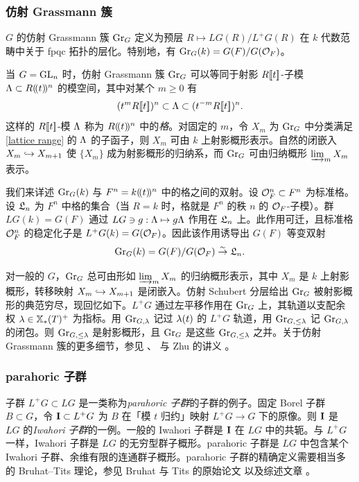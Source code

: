 \subsubsection{仿射 Grassmann 簇}\label{sss:Gr} $G$ 的仿射 Grassmann 簇 $\textup{Gr}_{G}$ 定义为预层 $R\mapsto LG(R)/L^{+}G(R)$ 在 $k$ 代数范畴中关于 fpqc 拓扑的层化。特别地，有 $\textup{Gr}_{G}(k)=G(F)/G(\mathcal{O}_{F})$。

当 $G=\textup{GL}_{n}$ 时，仿射 Grassmann 簇 $\textup{Gr}_{G}$ 可以等同于射影 $R[\![t]\!]$-子模 $\Lambda\subset R(\!(t)\!)^{n}$ 的模空间，其中对某个 $m\geq 0$ 有
\begin{equation}\label{lattice range}
(t^{m}R[\![t]\!])^{n}\subset \Lambda\subset (t^{-m}R[\![t]\!])^{n}.
\end{equation}
这样的 $R[\![t]\!]$-模 $\Lambda$ 称为 $R(\!(t)\!)^{n}$ 中的{\em 格}。对固定的 $m$，令 $X_{m}$ 为 $\textup{Gr}_{G}$ 中分类满足 \eqref{lattice range} 的 $\Lambda$ 的子函子，则 $X_{m}$ 可由 $k$ 上射影概形表示。自然的闭嵌入 $X_{m}\hookrightarrow X_{m+1}$ 使 $\{X_{m}\}$ 成为射影概形的归纳系，而 $\textup{Gr}_{G}$ 可由归纳概形 $\varinjlim_{m}X_{m}$ 表示。

我们来详述 $\textup{Gr}_{G}(k)$ 与 $F^{n}=k(\!(t)\!)^{n}$ 中的格之间的双射。设 $\mathcal{O}_{F}^{n}\subset F^{n}$ 为标准格。设 $\mathfrak{L}_{n}$ 为 $F^{n}$ 中格的集合（当 $R=k$ 时，格就是 $F^{n}$ 的秩 $n$ 的 $\mathcal{O}_{F}$-子模）。群 $LG(k)=G(F)$ 通过 $LG\ni g:\Lambda\mapsto g\Lambda$ 作用在 $\mathfrak{L}_{n}$ 上。此作用可迁，且标准格 $\mathcal{O}^{n}_{F}$ 的稳定化子是 $L^{+}G(k)=G(\mathcal{O}_{F})$。因此该作用诱导出 $G(F)$ 等变双射
\begin{equation}\label{Gr lattices}
\textup{Gr}_{G}(k)=G(F)/G(\mathcal{O}_{F})\stackrel{\sim}{\to} \mathfrak{L}_{n}.
\end{equation}

对一般的 $G$，$\textup{Gr}_{G}$ 总可由形如 $\varinjlim_{m}X_{m}$ 的归纳概形表示，其中 $X_{m}$ 是 $k$ 上射影概形，转移映射 $X_{m}\hookrightarrow X_{m+1}$ 是闭嵌入。仿射 Schubert 分层给出 $\textup{Gr}_{G}$ 被射影概形的典范穷尽，现回忆如下。$L^{+}G$ 通过左平移作用在 $\textup{Gr}_{G}$ 上，其轨道以支配余权 $\lambda\in\mathbb{X}_*(T)^{+}$ 为指标。用 $\textup{Gr}_{G,\lambda}$ 记过 $\lambda(t)$ 的 $L^{+}G$ 轨道，用 $\textup{Gr}_{G,\leq \lambda}$ 记 $\textup{Gr}_{G,\lambda}$ 的闭包。则 $\textup{Gr}_{G,\leq\lambda}$ 是射影概形，且 $\textup{Gr}_{G}$ 是这些 $\textup{Gr}_{G,\leq\lambda}$ 之并。关于仿射 Grassmann 簇的更多细节，参见 \cite[\S2]{BL}、\cite[\S2]{Faltings} 与 Zhu 的讲义 \cite{Zhu}。

\subsubsection{parahoric 子群} 子群 $L^{+}G\subset LG$ 是一类称为{\em parahoric 子群}的子群的例子。固定 Borel 子群 $B\subset G$，令 $\mathbf{I}\subset L^{+}G$ 为 $B$ 在「模 $t$ 归约」映射 $L^{+}G\to G$ 下的原像。则 $\mathbf{I}$ 是 $LG$ 的{\em Iwahori 子群}的一例。一般的 Iwahori 子群是 $\mathbf{I}$ 在 $LG$ 中的共轭。与 $L^{+}G$ 一样，Iwahori 子群是 $LG$ 的无穷型群子概形。parahoric 子群是 $LG$ 中包含某个 Iwahori 子群、余维有限的连通群子概形。parahoric 子群的精确定义需要相当多的 Bruhat--Tits 理论，参见 Bruhat 与 Tits 的原始论文 \cite{BT1} 以及综述文章 \cite{Tits}。

